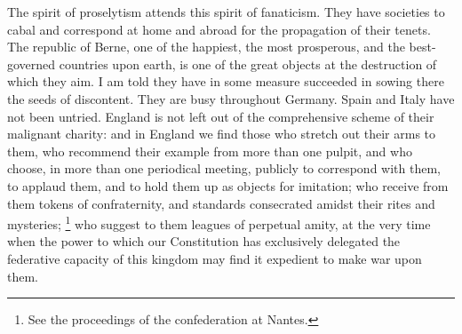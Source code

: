  The spirit of proselytism attends this spirit of fanaticism. They have societies to cabal and correspond at home and abroad for the propagation of their tenets. The republic of Berne, one of the happiest, the most prosperous, and the best-governed countries upon earth, is one of the great objects at the destruction of which they aim. I am told they have in some measure succeeded in sowing there the seeds of discontent. They are busy throughout Germany. Spain and Italy have not been untried. England is not left out of the comprehensive scheme of their malignant charity: and in England we find those who stretch out their arms to them, who recommend their example from more than one pulpit, and who choose, in more than one periodical meeting, publicly to correspond with them, to applaud them, and to hold them up as objects for imitation; who receive from them tokens of confraternity, and standards consecrated amidst their rites and mysteries;
\footnote{ See the proceedings of the confederation at Nantes.}
 who suggest to them leagues of perpetual amity, at the very time when the power to which our Constitution has exclusively delegated the federative capacity of this kingdom may find it expedient to make war upon them.

